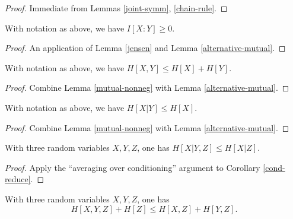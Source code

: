 \begin{proof}   
  Immediate from Lemmas \ref{joint-symm}, \ref{chain-rule}.
\end{proof}

\begin{lemma}\label{mutual-nonneg}  With notation as above, we have $I[X:Y] \geq 0$.
\end{lemma}

\begin{proof}   An application of Lemma \ref{jensen} and Lemma \ref{alternative-mutual}.
\end{proof}

\begin{corollary}[Subadditivity]\label{subadditive}  With notation as above, we have $H[X,Y] \leq H[X] + H[Y]$.
\end{corollary}

\begin{proof}  Combine Lemma \ref{mutual-nonneg} with Lemma \ref{alternative-mutual}.
\end{proof}

\begin{corollary}\label{cond-reduce}  With notation as above, we have $H[X|Y] \leq H[X]$.
\end{corollary}

\begin{proof}  Combine Lemma \ref{mutual-nonneg} with Lemma \ref{alternative-mutual}.
\end{proof}

\begin{corollary}[Submodularity]\label{submodularity}  With three random variables $X,Y,Z$, one has $H[X|Y,Z] \leq H[X|Z]$.
\end{corollary}

\begin{proof}  Apply the ``averaging over conditioning'' argument to Corollary \ref{cond-reduce}.
\end{proof}

\begin{corollary}\label{alt-submodularity} With three random variables $X,Y,Z$, one has
  $$ H[X,Y,Z] + H[Z] \leq H[X,Z] + H[Y,Z].$$
\end{corollary}

